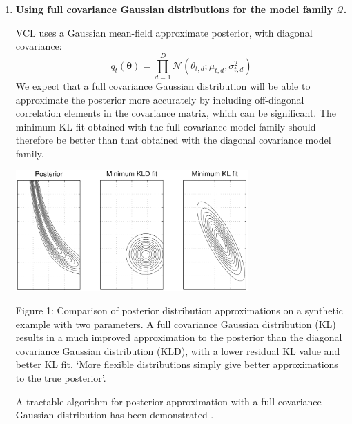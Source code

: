 \documentclass[a4paper,11=0pt]{article}
\let\boldtheta\theta %
\renewcommand{\theta}{\boldsymbol{\boldtheta}} %
\begin{document}
\begin{enumerate}
\item \textbf{Using full covariance Gaussian distributions for the model family $\mathcal{Q}$.}

VCL uses a Gaussian mean-field approximate posterior, with diagonal covariance: %
\[q_t(\theta) = \prod^D_{d=1} \mathcal{N}(\boldtheta_{t,d}; \mu_{t,d}, \sigma^2_{t,d})\]
We expect that a full covariance Gaussian distribution will be able to approximate the posterior more accurately by including off-diagonal correlation elements in the covariance matrix, which can be significant. The minimum KL fit obtained with the full covariance model family should therefore be better than that obtained with the diagonal covariance model family. %

\begin{center}
\includegraphics[width=0.7\textwidth]{approximations}
 \label{figure:family}
\end{center}
{Figure 1: Comparison of posterior distribution approximations on a synthetic example with two parameters. A full covariance Gaussian distribution (KL) results in a much improved approximation to the posterior than the diagonal covariance Gaussian distribution (KLD), with a lower residual KL value and better KL fit. `More flexible distributions \textelp{} simply give better approximations to the true posterior'.
\cite{ensemblelearning}}

A tractable algorithm for posterior approximation with a full covariance Gaussian distribution has been demonstrated \cite{ensemblelearning}. %

\end{enumerate}
\vspace{0.5em}
\end{document}
